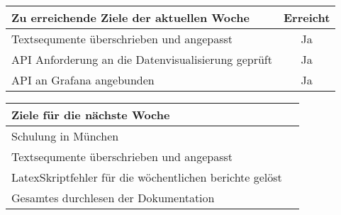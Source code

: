 \begin{tabularx}{\textwidth}{Xc}
    \arrayrulecolor{OliveGreen}
    \toprule
    {\bfseries Zu erreichende Ziele der aktuellen Woche} & {\bfseries Erreicht} \\
    \midrule[2pt]
    Textsequmente überschrieben und angepasst               &Ja              \\
    \rowcolor{OliveGreen!15}
    API Anforderung an die Datenvisualisierung geprüft      &Ja              \\
    \rowcolor{White}
    API an Grafana angebunden                               &Ja              \\
    \bottomrule[2pt]
\end{tabularx}
%
\vspace{1cm}
%
\begin{tabularx}{\textwidth}{Xc}
    \arrayrulecolor{OliveGreen}
    \toprule
    {\bfseries Ziele für die nächste Woche}        &                         \\
    \midrule[2pt]
    Schulung in München                            &                         \\
    \rowcolor{OliveGreen!15}
    Textsequmente überschrieben und angepasst      &                         \\
    \rowcolor{White}
    LatexSkriptfehler für die wöchentlichen berichte gelöst  &               \\
    \rowcolor{OliveGreen!15}
    Gesamtes durchlesen der Dokumentation                   &                \\
\end{tabularx}
